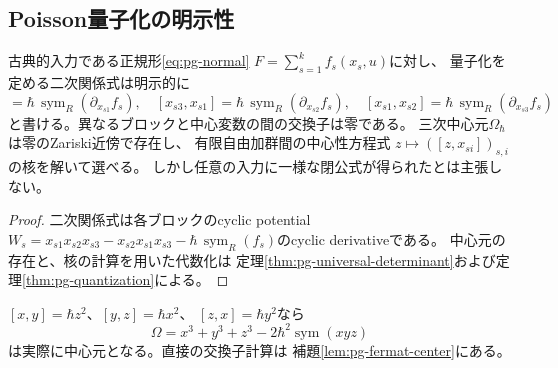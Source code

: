 \subsection{Poisson量子化の明示性}
\begin{proposition}\label{prop:poisson-quantization-explicit}
古典的入力である正規形\eqref{eq:pg-normal}
$F=\sum_{s=1}^k f_s(x_s,u)$に対し、
量子化を定める二次関係式は明示的に
\begin{equation}
 [x_{s2},x_{s3}]
 =\hbar\,\operatorname{sym}_R(\partial_{x_{s1}}f_s),
 \quad
 [x_{s3},x_{s1}]
 =\hbar\,\operatorname{sym}_R(\partial_{x_{s2}}f_s),
 \quad
 [x_{s1},x_{s2}]
 =\hbar\,\operatorname{sym}_R(\partial_{x_{s3}}f_s)
 \label{eq:ci-quantization-relations}
\end{equation}
と書ける。異なるブロックと中心変数の間の交換子は零である。
三次中心元$\Omega_\hbar$は零のZariski近傍で存在し、
有限自由加群間の中心性方程式
$z\mapsto([z,x_{si}])_{s,i}$の核を解いて選べる。
しかし任意の入力に一様な閉公式が得られたとは主張しない。
\end{proposition}
\begin{proof}
二次関係式は各ブロックのcyclic potential
$W_s=x_{s1}x_{s2}x_{s3}-x_{s2}x_{s1}x_{s3}
-\hbar\,\operatorname{sym}_R(f_s)$のcyclic derivativeである。
中心元の存在と、核の計算を用いた代数化は
定理\ref{thm:pg-universal-determinant}および定理\ref{thm:pg-quantization}による。
\end{proof}
\begin{example}[Fermat型]
$[x,y]=\hbar z^2$、$[y,z]=\hbar x^2$、
$[z,x]=\hbar y^2$なら
\begin{equation}
 \Omega=x^3+y^3+z^3
      -2\hbar^2\operatorname{sym}(xyz)
 \label{eq:ci-fermat-center}
\end{equation}
は実際に中心元となる。直接の交換子計算は
補題\ref{lem:pg-fermat-center}にある。
\end{example}
